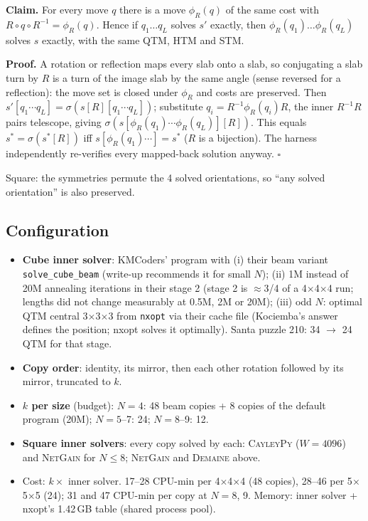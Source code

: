 \documentclass[10.5pt,a4paper]{article}
\newcommand{\Cu}[1]{#1$\times$#1$\times$#1}
\newcommand{\M}[1]{\textsc{#1}}
\begin{document}
\textbf{Claim.} For every move $q$ there is a move $\phi_R(q)$ of the same cost with $R\circ q\circ R^{-1}=\phi_R(q)$. Hence if
$q_1\ldots q_L$ solves $s'$ exactly, then $\phi_R(q_1)\ldots\phi_R(q_L)$ solves $s$ exactly, with the same QTM, HTM and STM.

\textbf{Proof.} A rotation or reflection maps every slab onto a slab, so conjugating a slab turn by $R$ is a turn of the image slab
by the same angle (sense reversed for a reflection): the move set is closed under $\phi_R$ and costs are preserved. Then
$s'[q_1\cdots q_L]=\sigma(s[R][q_1\cdots q_L])$; substitute $q_i=R^{-1}\phi_R(q_i)R$, the inner $R^{-1}R$ pairs telescope, giving
$\sigma(s[\phi_R(q_1)\cdots\phi_R(q_L)][R])$. This equals $s^\ast=\sigma(s^\ast[R])$ iff $s[\phi_R(q_1)\cdots]=s^\ast$ ($R$ is a
bijection). The harness independently re-verifies every mapped-back solution anyway. $\square$

Square: the symmetries permute the 4 solved orientations, so ``any solved orientation'' is also preserved.

\subsection{Configuration}
\begin{itemize}
\item \textbf{Cube inner solver}: KMCoders' program with (i) their beam variant \texttt{solve\_cube\_beam} (write-up recommends it for
small $N$); (ii) 1M instead of 20M annealing iterations in their stage 2 (stage 2 is $\approx$3/4 of a \Cu{4} run; lengths did not
change measurably at 0.5M, 2M or 20M); (iii) odd $N$: optimal QTM central \Cu{3} from \texttt{nxopt} via their cache file
(Kociemba's answer defines the position; nxopt solves it optimally). Santa puzzle 210: 34 $\to$ 24 QTM for that stage.
\item \textbf{Copy order}: identity, its mirror, then each other rotation followed by its mirror, truncated to $k$.
\item \textbf{$k$ per size} (budget): $N=4$: 48 beam copies + 8 copies of the default program (20M); $N=5$--7: 24; $N=8$--9: 12.
\item \textbf{Square inner solvers}: every copy solved by each: \M{CayleyPy} ($W=4096$) and \M{NetGain} for $N\le8$; \M{NetGain} and
\M{Demaine} above.
\item Cost: $k\times$ inner solver. 17--28 CPU-min per \Cu{4} (48 copies), 28--46 per \Cu{5} (24); 31 and 47 CPU-min per copy at
$N=8$, 9. Memory: inner solver + nxopt's 1.42\,GB table (shared process pool).
\end{itemize}
\end{document}
